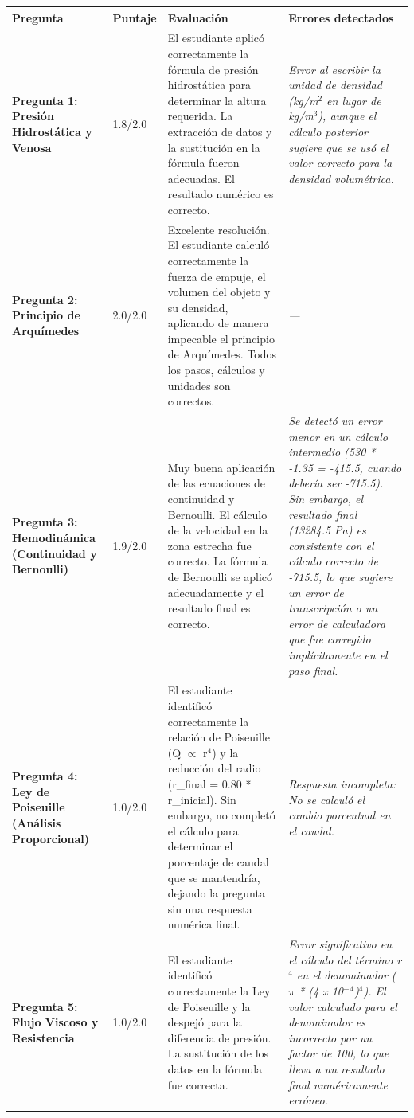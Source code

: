 \documentclass[11pt,a4paper]{article}
\begin{document}
\begin{longtable}{>{\bfseries}p{2.8cm} p{1.6cm} p{7.0cm} p{2.8cm}}
  \toprule
  \textbf{Pregunta} & \textbf{Puntaje} & \textbf{Evaluación} & \textbf{Errores detectados} \\
  \midrule
  \endhead
  \bottomrule
  \endfoot
    \textbf{Pregunta 1: Presión Hidrostática y Venosa} & 1.8/2.0 & El estudiante aplicó correctamente la fórmula de presión hidrostática para determinar la altura requerida. La extracción de datos y la sustitución en la fórmula fueron adecuadas. El resultado numérico es correcto. & \textit{Error al escribir la unidad de densidad (kg/m$^{2}$ en lugar de kg/m$^{3}$), aunque el cálculo posterior sugiere que se usó el valor correcto para la densidad volumétrica.} \\
    \midrule
    \textbf{Pregunta 2: Principio de Arquímedes} & 2.0/2.0 & Excelente resolución. El estudiante calculó correctamente la fuerza de empuje, el volumen del objeto y su densidad, aplicando de manera impecable el principio de Arquímedes. Todos los pasos, cálculos y unidades son correctos. & \textit{---} \\
    \midrule
    \textbf{Pregunta 3: Hemodinámica (Continuidad y Bernoulli)} & 1.9/2.0 & Muy buena aplicación de las ecuaciones de continuidad y Bernoulli. El cálculo de la velocidad en la zona estrecha fue correcto. La fórmula de Bernoulli se aplicó adecuadamente y el resultado final es correcto. & \textit{Se detectó un error menor en un cálculo intermedio (530 * -1.35 = -415.5, cuando debería ser -715.5). Sin embargo, el resultado final (13284.5 Pa) es consistente con el cálculo correcto de -715.5, lo que sugiere un error de transcripción o un error de calculadora que fue corregido implícitamente en el paso final.} \\
    \midrule
    \textbf{Pregunta 4: Ley de Poiseuille (Análisis Proporcional)} & 1.0/2.0 & El estudiante identificó correctamente la relación de Poiseuille (Q $\propto$ r$^{4}$) y la reducción del radio (r\_final = 0.80 * r\_inicial). Sin embargo, no completó el cálculo para determinar el porcentaje de caudal que se mantendría, dejando la pregunta sin una respuesta numérica final. & \textit{Respuesta incompleta: No se calculó el cambio porcentual en el caudal.} \\
    \midrule
    \textbf{Pregunta 5: Flujo Viscoso y Resistencia} & 1.0/2.0 & El estudiante identificó correctamente la Ley de Poiseuille y la despejó para la diferencia de presión. La sustitución de los datos en la fórmula fue correcta. & \textit{Error significativo en el cálculo del término r$^{4}$ en el denominador ($\pi$ * (4 x 10$^{-}$$^{4}$)$^{4}$). El valor calculado para el denominador es incorrecto por un factor de 100, lo que lleva a un resultado final numéricamente erróneo.} \\
    \midrule
\end{longtable}
\end{document}
